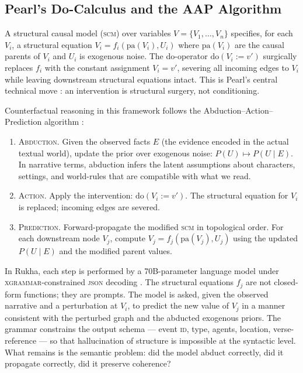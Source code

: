 \documentclass[11pt]{article}
\theoremstyle{rukha}
\newcommand{\sceq}[1]{\textsc{#1}}
\begin{document}
\subsection{Pearl's Do-Calculus and the AAP Algorithm}

A structural causal model (\textsc{scm}) over variables $V = \{V_1,
\dots, V_n\}$ specifies, for each $V_i$, a structural equation $V_i =
f_i(\text{pa}(V_i), U_i)$ where $\text{pa}(V_i)$ are the causal parents
of $V_i$ and $U_i$ is exogenous noise. The do-operator $\text{do}(V_i :=
v')$ surgically replaces $f_i$ with the constant assignment $V_i = v'$,
severing all incoming edges to $V_i$ while leaving downstream structural
equations intact. This is Pearl's central technical move
\cite{pearlcausality}: an intervention is structural surgery, not
conditioning.

Counterfactual reasoning in this framework follows the
Abduction–Action–Prediction algorithm \cite{pearlalgorithmization,
pearlrobins}:

\begin{enumerate}
  \item \sceq{Abduction.} Given the observed facts $E$ (the evidence
    encoded in the actual textual world), update the prior over
    exogenous noise: $P(U) \mapsto P(U \mid E)$. In narrative terms,
    abduction infers the latent assumptions about characters, settings,
    and world-rules that are compatible with what we read.
  \item \sceq{Action.} Apply the intervention: $\text{do}(V_i := v')$.
    The structural equation for $V_i$ is replaced; incoming edges are
    severed.
  \item \sceq{Prediction.} Forward-propagate the modified \textsc{scm}
    in topological order. For each downstream node $V_j$, compute
    $V_j = f_j(\text{pa}(V_j), U_j)$ using the updated $P(U \mid E)$ and
    the modified parent values.
\end{enumerate}

In Rukha, each step is performed by a 70B-parameter language model under
\textsc{xgrammar}-constrained \textsc{json} decoding
\cite{xgrammar}. The structural equations $f_j$ are not closed-form
functions; they are prompts. The model is asked, given the observed
narrative and a perturbation at $V_i$, to predict the new value of $V_j$
in a manner consistent with the perturbed graph and the abducted
exogenous priors. The grammar constrains the output schema --- event
\textsc{id}, type, agents, location, verse-reference --- so that
hallucination of structure is impossible at the syntactic level. What
remains is the semantic problem: did the model abduct correctly, did it
propagate correctly, did it preserve coherence?
\end{document}
